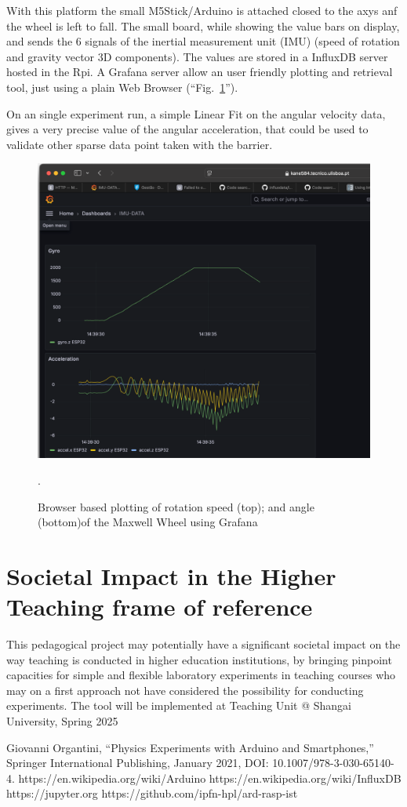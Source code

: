 \documentclass[conference]{IEEEtran}
\begin{document}
With this platform the small M5Stick/Arduino is attached closed to the axys anf the wheel is left to fall.
The small board, while showing the value bars on  display, and sends 
 the 6 signals of the inertial measurement unit (IMU) (speed of rotation and gravity vector 3D components). The values are stored in a InfluxDB server hosted in the Rpi. A Grafana server allow an user friendly plotting and retrieval tool, just using a plain Web Browser (``Fig.~\ref{figIMU}''). 

On an single experiment run, a simple Linear Fit on the angular velocity data, gives a very precise value of the angular acceleration,
that could be used to validate other sparse data point taken with the barrier.


\begin{figure}[htbp]
\centerline{\includegraphics[width=.6\columnwidth]{IMUGrafana.png}}
\caption{Browser based plotting of rotation speed (top); and angle (bottom)of the Maxwell Wheel using Grafana}.
\label{figIMU}
\end{figure}


  
\section{Societal Impact in the Higher Teaching frame of reference}
This pedagogical project may potentially have a significant societal impact on the way teaching is conducted in higher education institutions, by bringing pinpoint capacities for simple and flexible laboratory experiments in teaching courses who may on a first approach not have considered the possibility for conducting experiments.
The tool will be implemented at Teaching Unit @ Shangai University, Spring 2025

\begin{thebibliography}{00}
Giovanni Organtini, ``Physics Experiments with Arduino and Smartphones,''
Springer International Publishing, January 2021, DOI: 10.1007/978-3-030-65140-4.
 https://en.wikipedia.org/wiki/Arduino
 https://en.wikipedia.org/wiki/InfluxDB
 https://jupyter.org 
 https://github.com/ipfn-hpl/ard-rasp-ist
\end{thebibliography}
\end{document}
